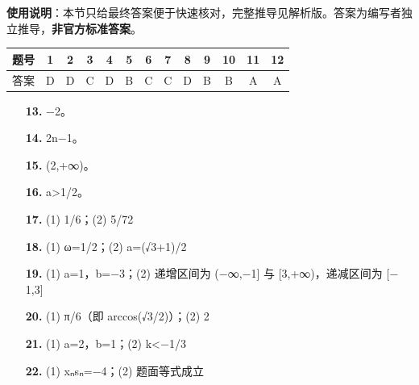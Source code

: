 
\begin{gknotice}
\textbf{使用说明}：本节只给最终答案便于快速核对，完整推导见解析版。答案为编写者独立推导，\textbf{非官方标准答案}。
\end{gknotice}

\begin{center}\begin{tabular}{ccccccccccccc}
\toprule
题号 & 1 & 2 & 3 & 4 & 5 & 6 & 7 & 8 & 9 & 10 & 11 & 12 \\
\midrule
答案 & D & D & C & D & B & C & C & D & B & B & A & A \\
\bottomrule
\end{tabular}\end{center}

\begin{itemize}[leftmargin=2.6em]
  \item[\textbf{13.}] $-$2。
  \item[\textbf{14.}] 2n$-$1。
  \item[\textbf{15.}] (2,+∞)。
  \item[\textbf{16.}] a>1/2。
\end{itemize}

\begin{itemize}[leftmargin=2.6em]
  \item[\textbf{17.}] (1) 1/6；(2) 5/72
  \item[\textbf{18.}] (1) ω=1/2；(2) a=(√3+1)/2
  \item[\textbf{19.}] (1) a=1，b=$-$3；(2) 递增区间为 ($-$∞,$-$1] 与 [3,+∞)，递减区间为 [$-$1,3]
  \item[\textbf{20.}] (1) π/6（即 arccos(√3/2)）；(2) 2
  \item[\textbf{21.}] (1) a=2，b=1；(2) k<$-$1/3
  \item[\textbf{22.}] (1) xₙsₙ=$-$4；(2) 题面等式成立
\end{itemize}
